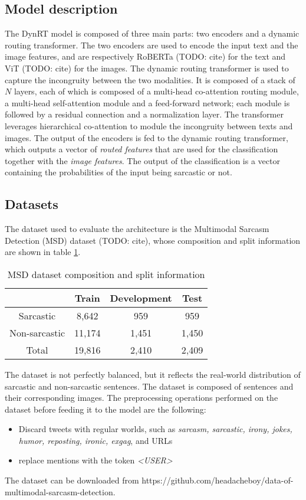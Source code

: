 \subsection{Model description}
The DynRT model is composed of three main parts: two encoders and a dynamic routing transformer. The two encoders are used to encode the input text and the image features, and are respectively RoBERTa (TODO: cite) for the text and ViT (TODO: cite) for the images. The dynamic routing transformer is used to capture the incongruity between the two modalities. It is composed of a stack of $N$ layers, each of which is composed of a multi-head co-attention routing module, a multi-head self-attention module and a feed-forward network; each module is followed by a residual connection and a normalization layer. The transformer leverages hierarchical co-attention to module the incongruity between texts and images. The output of the encoders is fed to the dynamic routing transformer, which outputs a vector of \textit{routed features} that are used for the classification together with the \textit{image features}. The output of the classification is a vector containing the probabilities of the input being sarcastic or not. 

\subsection{Datasets}
The dataset used to evaluate the architecture is the Multimodal Sarcasm Detection (MSD) dataset (TODO: cite), whose composition and split information are shown in table \ref{tab:MSD}.
\begin{table}
    \caption{MSD dataset composition and split information}
    \label{tab:MSD}
    \centering
    \begin{tabular}{|c c c c|}
        \hline
         & \textbf{Train} & \textbf{Development} & \textbf{Test} \\
        \hline
        Sarcastic & 8,642 & 959 & 959 \\
        Non-sarcastic & 11,174 & 1,451 & 1,450 \\
        Total & 19,816 & 2,410 & 2,409 \\
        \hline
    \end{tabular}
\end{table}
The dataset is not perfectly balanced, but it reflects the real-world distribution of sarcastic and non-sarcastic sentences. The dataset is composed of sentences and their corresponding images. The preprocessing operations performed on the dataset before feeding it to the model are the following:
\begin{itemize}
    \item Discard tweets with regular worlds, such as \textit{sarcasm, sarcastic, irony, jokes, humor, reposting, ironic, exgag}, and URLs
    \item replace mentions with the token \textit{<USER>}
\end{itemize}
The dataset can be downloaded from https://github.com/headacheboy/data-of-multimodal-sarcasm-detection.



